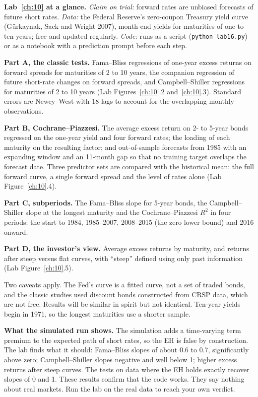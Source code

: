 \begin{callout}
\textbf{Lab~\ref{ch:10} at a glance.} \emph{Claim on trial:} forward rates are unbiased forecasts of future short rates. \emph{Data:} the Federal Reserve's zero-coupon Treasury yield curve (G\"urkaynak, Sack and Wright 2007), month-end yields for maturities of one to ten years; free and updated regularly. \emph{Code:} runs as a script (\texttt{python lab16.py}) or as a notebook with a prediction prompt before each step.
\end{callout}

\textbf{Part A, the classic tests.} Fama--Bliss regressions of one-year excess returns on forward spreads for maturities of 2 to 10 years, the companion regression of future short-rate changes on forward spreads, and Campbell--Shiller regressions for maturities of 2 to 10 years (Lab Figures~\ref{ch:10}.2 and~\ref{ch:10}.3). Standard errors are Newey--West with 18 lags to account for the overlapping monthly observations.

\textbf{Part B, Cochrane--Piazzesi.} The average excess return on 2- to 5-year bonds regressed on the one-year yield and four forward rates; the loading of each maturity on the resulting factor; and out-of-sample forecasts from 1985 with an expanding window and an 11-month gap so that no training target overlaps the forecast date. Three predictor sets are compared with the historical mean: the full forward curve, a single forward spread and the level of rates alone (Lab Figure~\ref{ch:10}.4).

\textbf{Part C, subperiods.} The Fama--Bliss slope for 5-year bonds, the Campbell--Shiller slope at the longest maturity and the Cochrane--Piazzesi $R^2$ in four periods: the start to 1984, 1985--2007, 2008--2015 (the zero lower bound) and 2016 onward.

\textbf{Part D, the investor's view.} Average excess returns by maturity, and returns after steep versus flat curves, with ``steep'' defined using only past information (Lab Figure~\ref{ch:10}.5).

Two caveats apply. The Fed's curve is a fitted curve, not a set of traded bonds, and the classic studies used discount bonds constructed from CRSP data, which are not free. Results will be similar in spirit but not identical. Ten-year yields begin in 1971, so the longest maturities use a shorter sample.

\textbf{What the simulated run shows.} The simulation adds a time-varying term premium to the expected path of short rates, so the EH is false by construction. The lab finds what it should: Fama--Bliss slopes of about 0.6 to 0.7, significantly above zero; Campbell--Shiller slopes negative and well below 1; higher excess returns after steep curves. The tests on data where the EH holds exactly recover slopes of 0 and 1. These results confirm that the code works. They say nothing about real markets. Run the lab on the real data to reach your own verdict.

